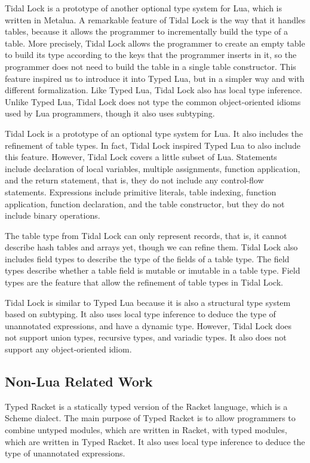 Tidal Lock \citep{tidallock} is a prototype of another optional type
system for Lua, which is written in Metalua.
A remarkable feature of Tidal Lock is the way that it handles tables,
because it allows the programmer to incrementally build the type of
a table.
More precisely, Tidal Lock allows the programmer to create an empty
table to build its type according to the keys that the programmer
inserts in it, so the programmer does not need to build the table in
a single table constructor.
This feature inspired us to introduce it into Typed Lua,
but in a simpler way and with different formalization.
Like Typed Lua, Tidal Lock also has local type inference.
Unlike Typed Lua, Tidal Lock does not type the common object-oriented
idioms used by Lua programmers, though it also uses subtyping.

Tidal Lock \citep{tidallock} is a prototype of an optional type system for Lua.
It also includes the refinement of table types.
In fact, Tidal Lock inspired Typed Lua to also include this feature.
However, Tidal Lock covers a little subset of Lua.
Statements include declaration of local variables, multiple assignments,
function application, and the return statement, that is, they do not
include any control-flow statements.
Expressions include primitive literals, table indexing, function application,
function declaration, and the table constructor, but they do not include
binary operations.

The table type from Tidal Lock can only represent records, that is,
it cannot describe hash tables and arrays yet, though we can refine them.
Tidal Lock also includes field types to describe the type of the fields
of a table type.
The field types describe whether a table field is mutable or imutable
in a table type.
Field types are the feature that allow the refinement of table types in
Tidal Lock.

Tidal Lock is similar to Typed Lua because it is also a structural type
system based on subtyping.
It also uses local type inference to deduce the type of unannotated expressions,
and have a dynamic type.
However, Tidal Lock does not support union types, recursive types, and variadic types.
It also does not support any object-oriented idiom.

\subsection{Non-Lua Related Work}

Typed Racket \citep{tobin-hochstadt2008ts} is a statically typed version
of the Racket language, which is a Scheme dialect.
The main purpose of Typed Racket is to allow programmers to combine
untyped modules, which are written in Racket, with typed modules, which are
written in Typed Racket.
It also uses local type inference to deduce the type of unannotated expressions.

